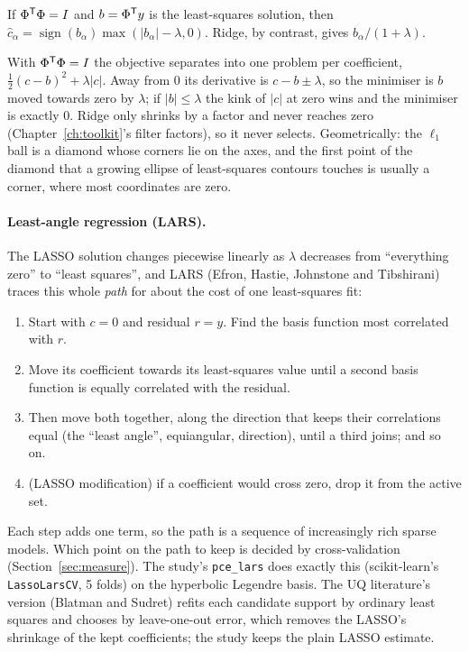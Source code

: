 \begin{result}
\label{res:soft}
If $\Phi^{\mathsf{T}}\Phi = I$ and $b = \Phi^{\mathsf{T}} y$ is the least-squares solution, then
$\hat c_\alpha = \operatorname{sign}(b_\alpha)\max(|b_\alpha| - \lambda, 0)$. Ridge, by contrast, gives
$b_\alpha/(1+\lambda)$.
\end{result}
\begin{intuition}
With $\Phi^{\mathsf{T}}\Phi = I$ the objective separates into one problem per coefficient,
$\tfrac12(c - b)^2 + \lambda|c|$. Away from $0$ its derivative is $c - b \pm \lambda$, so the minimiser is $b$
moved towards zero by $\lambda$; if $|b| \le \lambda$ the kink of $|c|$ at zero wins and the minimiser is exactly
$0$. Ridge only shrinks by a factor and never reaches zero (Chapter~\ref{ch:toolkit}'s filter factors), so it never
selects. Geometrically: the $\ell_1$ ball is a diamond whose corners lie on the axes, and the first point of the
diamond that a growing ellipse of least-squares contours touches is usually a corner, where most coordinates are zero.
\end{intuition}

\paragraph{Least-angle regression (LARS).} The LASSO solution changes piecewise linearly as $\lambda$ decreases from
``everything zero'' to ``least squares'', and LARS (Efron, Hastie, Johnstone and Tibshirani) traces this whole
\emph{path} for about the cost of one least-squares fit:
\begin{enumerate}[nosep]
  \item Start with $c = 0$ and residual $r = y$. Find the basis function most correlated with $r$.
  \item Move its coefficient towards its least-squares value until a second basis function is equally correlated
        with the residual.
  \item Then move both together, along the direction that keeps their correlations equal (the ``least angle'',
        equiangular, direction), until a third joins; and so on.
  \item (LASSO modification) if a coefficient would cross zero, drop it from the active set.
\end{enumerate}
Each step adds one term, so the path is a sequence of increasingly rich sparse models. Which point on the path to
keep is decided by cross-validation (Section~\ref{sec:measure}). The study's \texttt{pce\_lars} does exactly this
(scikit-learn's \texttt{LassoLarsCV}, 5 folds) on the hyperbolic Legendre basis. The UQ literature's version (Blatman
and Sudret) refits each candidate support by ordinary least squares and chooses by leave-one-out error, which
removes the LASSO's shrinkage of the kept coefficients; the study keeps the plain LASSO estimate.

